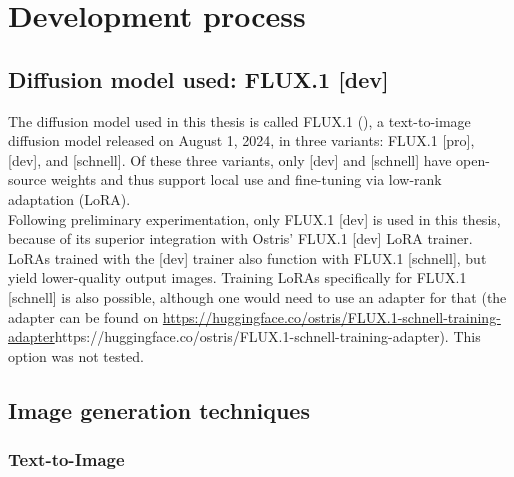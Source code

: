 \chapter{Development process}

\section{Diffusion model used: FLUX.1 [dev]} \label{sec:Models used}
The diffusion model used in this thesis is called FLUX.1 (\cite{black_forest_labs_announcing_2024}), a text-to-image diffusion model released on August 1, 2024, in three variants: FLUX.1 [pro], [dev], and [schnell]. Of these three variants, only [dev] and [schnell] have open-source weights and thus support local use and fine-tuning via low-rank adaptation (LoRA).\\
Following preliminary experimentation, only FLUX.1 [dev] is used in this thesis, because of its superior integration with Ostris' FLUX.1 [dev] LoRA trainer. LoRAs trained with the [dev] trainer also function with FLUX.1 [schnell], but yield lower-quality output images. Training LoRAs specifically for FLUX.1 [schnell] is also possible, although one would need to use an adapter for that (the adapter can be found on \url{https://huggingface.co/ostris/FLUX.1-schnell-training-adapter}{https://huggingface.co/ostris/FLUX.1-schnell-training-adapter}). This option was not tested.
\section{Image generation techniques}
\subsection{Text-to-Image}
